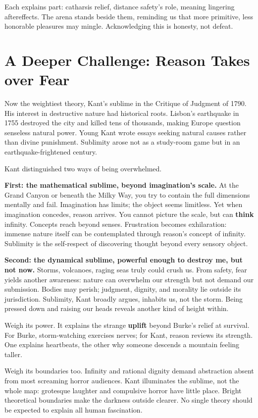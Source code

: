 Each explains part: catharsis relief, distance safety's role, meaning lingering aftereffects. The arena stands beside them, reminding us that more primitive, less honorable pleasures may mingle. Acknowledging this is honesty, not defeat.

\section{A Deeper Challenge: Reason Takes over Fear}
Now the weightiest theory, Kant's sublime in the Critique of Judgment of 1790. His interest in destructive nature had historical roots. Lisbon's earthquake in 1755 destroyed the city and killed tens of thousands, making Europe question senseless natural power. Young Kant wrote essays seeking natural causes rather than divine punishment. Sublimity arose not as a study-room game but in an earthquake-frightened century.

Kant distinguished two ways of being overwhelmed.

\textbf{First: the mathematical sublime, beyond imagination's scale.} At the Grand Canyon or beneath the Milky Way, you try to contain the full dimensions mentally and fail. Imagination has limits; the object seems limitless. Yet when imagination concedes, reason arrives. You cannot picture the scale, but can \textbf{think} infinity. Concepts reach beyond senses. Frustration becomes exhilaration: immense nature itself can be contemplated through reason's concept of infinity. Sublimity is the self-respect of discovering thought beyond every sensory object.

\textbf{Second: the dynamical sublime, powerful enough to destroy me, but not now.} Storms, volcanoes, raging seas truly could crush us. From safety, fear yields another awareness: nature can overwhelm our strength but not demand our submission. Bodies may perish; judgment, dignity, and morality lie outside its jurisdiction. Sublimity, Kant broadly argues, inhabits us, not the storm. Being pressed down and raising our heads reveals another kind of height within.

Weigh its power. It explains the strange \textbf{uplift} beyond Burke's relief at survival. For Burke, storm-watching exercises nerves; for Kant, reason reviews its strength. One explains heartbeats, the other why someone descends a mountain feeling taller.

Weigh its boundaries too. Infinity and rational dignity demand abstraction absent from most screaming horror audiences. Kant illuminates the sublime, not the whole map: grotesque laughter and compulsive horror have little place. Bright theoretical boundaries make the darkness outside clearer. No single theory should be expected to explain all human fascination.

